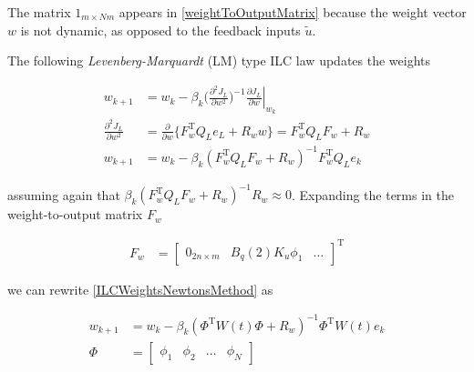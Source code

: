 \documentclass[10pt,a4paper]{article}
\newcommand\at[2]{\left.#1\right|_{#2}} %
\newcommand{\joint}{q} %
\newcommand{\error}{e} %
\newcommand{\sysInput}{u} %
\newcommand{\linInput}{\tilde{u}} %
\newcommand{\weights}{w} %
\newcommand{\basis}{\phi} %
\newcommand{\ValueFunction}{J}
\begin{document}
The matrix $1_{m\times Nm}$ appears in \eqref{weightToOutputMatrix} because the weight vector $\weights$ is not dynamic, as opposed to the feedback inputs $\linInput$.

The following \emph{Levenberg-Marquardt} (LM) type ILC law updates the weights

\begin{equation}
\begin{aligned}
\weights_{k+1} &= \weights_k - \beta_k\Big(\frac{\partial^{2}\ValueFunction_L}{\partial\weights^{2}}\Big)^{-1}\at{\frac{\partial{\ValueFunction_L}}{\partial{\weights}}}{\weights_k} \\
\frac{\partial^{2}\ValueFunction_L}{\partial\weights^{2}} &= \frac{\partial}{\partial\weights}\{F_{\weights}^{\mathrm{T}}Q_L\error_L + R_{\weights}\weights\} = F_{\weights}^{\mathrm{T}}Q_LF_{\weights} + R_{\weights} \\
\weights_{k+1} &= \weights_k - \beta_k(F_{\weights}^{\mathrm{T}}Q_LF_{\weights} + R_{\weights})^{-1}F_{\weights}^{\mathrm{T}}Q_L\error_k
\end{aligned}
\label{ILCWeightsNewtonsMethod}
\end{equation}

assuming again that $\beta_k(F_{\weights}^{\mathrm{T}}Q_LF_{\weights} + R_{\weights})^{-1}R_{\weights} \approx 0$. Expanding the terms in the weight-to-output matrix $F_{\weights}$

\begin{equation}
\begin{aligned}
F_{\weights} &= \begin{bmatrix}
  0_{2n \times m} & B_{\joint}(2)K_{\sysInput}\basis_{1} & \ldots
 \end{bmatrix}^{\mathrm{T}}
\end{aligned}
\label{weightToOutputMatrixExpanded}
\end{equation}

we can rewrite \eqref{ILCWeightsNewtonsMethod} as

\begin{equation}
\begin{aligned}
\weights_{k+1} &= \weights_k - \beta_k(\Phi^{\mathrm{T}}W(t)\Phi + R_{\weights})^{-1}\Phi^{\mathrm{T}}W(t)\error_k \\
\Phi &= \begin{bmatrix}
  \basis_1 & \basis_2 & \ldots & \basis_N
 \end{bmatrix}
\end{aligned}
\label{ILCWeightedRidgeRegression}
\end{equation}
\end{document}
